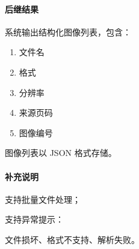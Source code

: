 {\paragraph*{后继结果}

系统输出结构化图像列表，包含：

\begin{enumerate}
    \item 文件名
    \item 格式
    \item 分辨率
    \item 来源页码
    \item 图像编号
\end{enumerate}

图像列表以 JSON 格式存储。

\paragraph*{补充说明}

支持批量文件处理；

支持异常提示：

文件损坏、格式不支持、解析失败。
}

